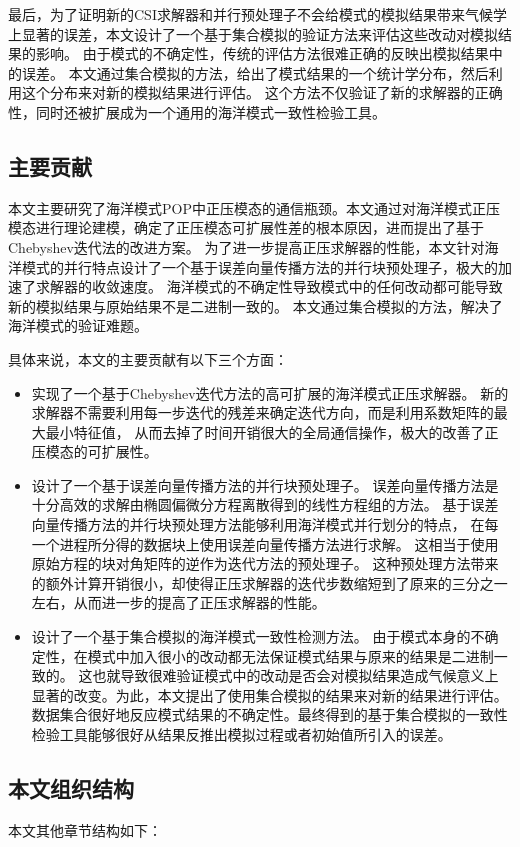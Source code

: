 最后，为了证明新的CSI求解器和并行预处理子不会给模式的模拟结果带来气候学上显著的误差，本文设计了一个基于集合模拟的验证方法来评估这些改动对模拟结果的影响。 
由于模式的不确定性，传统的评估方法很难正确的反映出模拟结果中的误差。
本文通过集合模拟的方法，给出了模式结果的一个统计学分布，然后利用这个分布来对新的模拟结果进行评估。
这个方法不仅验证了新的求解器的正确性，同时还被扩展成为一个通用的海洋模式一致性检验工具。 

\subsection{主要贡献}
本文主要研究了海洋模式POP中正压模态的通信瓶颈。本文通过对海洋模式正压模态进行理论建模，确定了正压模态可扩展性差的根本原因，进而提出了基于Chebyshev迭代法的改进方案。
为了进一步提高正压求解器的性能，本文针对海洋模式的并行特点设计了一个基于误差向量传播方法的并行块预处理子，极大的加速了求解器的收敛速度。
海洋模式的不确定性导致模式中的任何改动都可能导致新的模拟结果与原始结果不是二进制一致的。
本文通过集合模拟的方法，解决了海洋模式的验证难题。

具体来说，本文的主要贡献有以下三个方面：
\begin{itemize}
 	\item {\kaishu 实现了一个基于Chebyshev迭代方法的高可扩展的海洋模式正压求解器。} 
 	新的求解器不需要利用每一步迭代的残差来确定迭代方向，而是利用系数矩阵的最大最小特征值，
 	从而去掉了时间开销很大的全局通信操作，极大的改善了正压模态的可扩展性。
    \item {\kaishu 设计了一个基于误差向量传播方法的并行块预处理子。}
    误差向量传播方法是十分高效的求解由椭圆偏微分方程离散得到的线性方程组的方法。
    基于误差向量传播方法的并行块预处理方法能够利用海洋模式并行划分的特点，
    在每一个进程所分得的数据块上使用误差向量传播方法进行求解。
    这相当于使用原始方程的块对角矩阵的逆作为迭代方法的预处理子。
    这种预处理方法带来的额外计算开销很小，却使得正压求解器的迭代步数缩短到了原来的三分之一左右，从而进一步的提高了正压求解器的性能。
    \item {\kaishu 设计了一个基于集合模拟的海洋模式一致性检测方法。}
    由于模式本身的不确定性，在模式中加入很小的改动都无法保证模式结果与原来的结果是二进制一致的。
    这也就导致很难验证模式中的改动是否会对模拟结果造成气候意义上显著的改变。为此，本文提出了使用集合模拟的结果来对新的结果进行评估。数据集合很好地反应模式结果的不确定性。最终得到的基于集合模拟的一致性检验工具能够很好从结果反推出模拟过程或者初始值所引入的误差。  
\end{itemize}
\subsection{本文组织结构}
本文其他章节结构如下：

